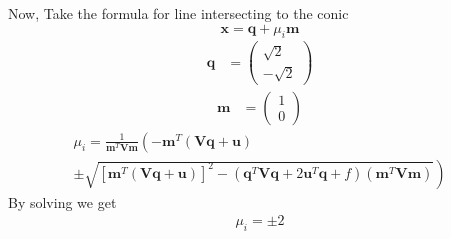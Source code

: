 \documentclass[10pt,a4paper]{report}
\newcommand{\myvec}[1]{\ensuremath{\begin{pmatrix}#1\end{pmatrix}}}
\providecommand{\brak}[1]{\ensuremath{\left(#1\right)}}
\providecommand{\lbrak}[1]{\ensuremath{\left(#1\right.}}
\providecommand{\rbrak}[1]{\ensuremath{\left.#1\right)}}
\providecommand{\sbrak}[1]{\ensuremath{{}\left[#1\right]}}
\let\vec\mathbf
\begin{document}
\begin{multicols}{2}
Now, Take the formula for line intersecting to the conic 
\vspace{0.25cm}\\
\begin{equation}
\vec{x}=\vec{q}+\mu_i\vec{m}
\end{equation}
\begin{align} 
\vec{q} &= \myvec{\sqrt{2} \\ -\sqrt{2}} 
\end{align}
\begin{align} 
\vec{m} &= \myvec{1 \\ 0} 
\end{align}
\begin{multline}
\mu_i = \frac{1}
{
\vec{m}^T\vec{V}\vec{m}
}
\lbrak{-\vec{m}^T\brak{\vec{V}\vec{q}+\vec{u}}}
\\
\pm
\rbrak{\sqrt{
\sbrak{
\vec{m}^T\brak{\vec{V}\vec{q}+\vec{u}}
}^2
-
\brak
{
\vec{q}^T\vec{V}\vec{q} + 2\vec{u}^T\vec{q} +f
}
\brak{\vec{m}^T\vec{V}\vec{m}}
}
}
\end{multline}
By solving we get 
\begin{align}
\mu_i=\pm 2
\end{align}


\end{multicols}
\end{document}
